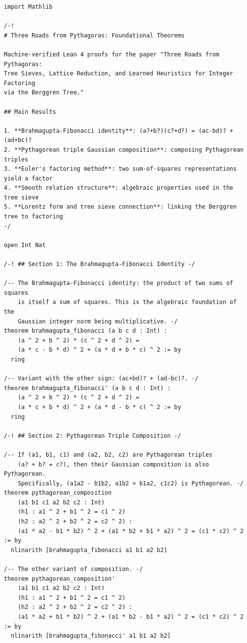 \documentclass[11pt,twoside,openright]{book}
\theoremstyle{definition}
\theoremstyle{remark}
\begin{document}
\begin{lstlisting}[style=lean]
import Mathlib

/-!
# Three Roads from Pythagoras: Foundational Theorems

Machine-verified Lean 4 proofs for the paper "Three Roads from Pythagoras:
Tree Sieves, Lattice Reduction, and Learned Heuristics for Integer Factoring
via the Berggren Tree."

## Main Results

1. **Brahmagupta-Fibonacci identity**: (a?+b?)(c?+d?) = (ac-bd)? + (ad+bc)?
2. **Pythagorean triple Gaussian composition**: composing Pythagorean triples
3. **Euler's factoring method**: two sum-of-squares representations yield a factor
4. **Smooth relation structure**: algebraic properties used in the tree sieve
5. **Lorentz form and tree sieve connection**: linking the Berggren tree to factoring
-/

open Int Nat

/-! ## Section 1: The Brahmagupta-Fibonacci Identity -/

/-- The Brahmagupta-Fibonacci identity: the product of two sums of squares
    is itself a sum of squares. This is the algebraic foundation of the
    Gaussian integer norm being multiplicative. -/
theorem brahmagupta_fibonacci (a b c d : Int) :
    (a ^ 2 + b ^ 2) * (c ^ 2 + d ^ 2) =
    (a * c - b * d) ^ 2 + (a * d + b * c) ^ 2 := by
  ring

/-- Variant with the other sign: (ac+bd)? + (ad-bc)?. -/
theorem brahmagupta_fibonacci' (a b c d : Int) :
    (a ^ 2 + b ^ 2) * (c ^ 2 + d ^ 2) =
    (a * c + b * d) ^ 2 + (a * d - b * c) ^ 2 := by
  ring

/-! ## Section 2: Pythagorean Triple Composition -/

/-- If (a1, b1, c1) and (a2, b2, c2) are Pythagorean triples
    (a? + b? = c?), then their Gaussian composition is also Pythagorean.
    Specifically, (a1a2 - b1b2, a1b2 + b1a2, c1c2) is Pythagorean. -/
theorem pythagorean_composition
    (a1 b1 c1 a2 b2 c2 : Int)
    (h1 : a1 ^ 2 + b1 ^ 2 = c1 ^ 2)
    (h2 : a2 ^ 2 + b2 ^ 2 = c2 ^ 2) :
    (a1 * a2 - b1 * b2) ^ 2 + (a1 * b2 + b1 * a2) ^ 2 = (c1 * c2) ^ 2 := by
  nlinarith [brahmagupta_fibonacci a1 b1 a2 b2]

/-- The other variant of composition. -/
theorem pythagorean_composition'
    (a1 b1 c1 a2 b2 c2 : Int)
    (h1 : a1 ^ 2 + b1 ^ 2 = c1 ^ 2)
    (h2 : a2 ^ 2 + b2 ^ 2 = c2 ^ 2) :
    (a1 * a2 + b1 * b2) ^ 2 + (a1 * b2 - b1 * a2) ^ 2 = (c1 * c2) ^ 2 := by
  nlinarith [brahmagupta_fibonacci' a1 b1 a2 b2]


\end{lstlisting}
\end{document}
